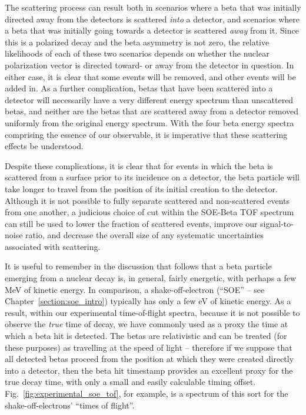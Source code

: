 The scattering process can result both in scenarios where a beta that was initially directed away from the detectors is scattered \emph{into} a detector, and scenarios where a beta that was initially going towards a detector is scattered \emph{away} from it. Since this is a polarized decay and the beta asymmetry is not zero, the relative likelihoods of each of these two scenarios depends on whether the nuclear polarization vector is directed toward- or away from the detector in question.  In either case, it is clear that some events will be removed, and other events will be added in.  As a further complication, betas that have been scattered into a detector will necessarily have a very different energy spectrum than unscattered betas, and neither are the betas that are scattered away from a detector removed uniformly from the original energy spectrum.  With the four beta energy spectra comprising the essence of our observable, it is imperative that these scattering effects be understood.  

Despite these complications, it is clear that for events in which the beta is scattered from a surface prior to its incidence on a detector, the beta particle will take longer to travel from the position of its initial creation to the detector.  Although it is not possible to fully separate scattered and non-scattered events from one another, a judicious choice of cut within the SOE-Beta TOF spectrum can still be used to lower the fraction of scattered events, improve our signal-to-noise ratio, and decrease the overall size of any systematic uncertainties associated with scattering.


It is useful to remember in the discussion that follows that a beta particle emerging from a nuclear decay is, in general, fairly energetic, with perhaps a few MeV of kinetic energy.  In comparison, a shake-off-electron (``SOE'' -- see Chapter~\ref{section:soe_intro}) typically has only a few eV of kinetic energy.   As a result, within our experimental time-of-flight spectra, because it is not possible to observe the \emph{true}  time of decay, we have commonly used as a proxy the time at which a beta hit is detected.  The betas are relativistic and can be treated (for these purposes) as travelling at the speed of light -- therefore if we suppose that all detected betas proceed from the position at which they were created directly into a detector, then the beta hit timestamp provides an excellent proxy for the true decay time, with only a small and easily calculable timing offset.  Fig.~\ref{fig:experimental_soe_tof}, for example, is a spectrum of this sort for the shake-off-electrons' ``times of flight''.  

